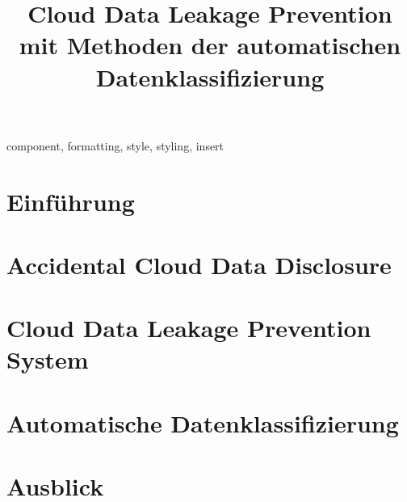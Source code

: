 \documentclass[conference]{IEEEtran}
\begin{document}
\title{Cloud Data Leakage Prevention mit Methoden der automatischen Datenklassifizierung}

\author{
}

\maketitle

\begin{abstract}
    
\end{abstract}

\begin{IEEEkeywords}
    component, formatting, style, styling, insert
\end{IEEEkeywords}

\section{Einführung}


\section{Accidental Cloud Data Disclosure} \label{threat-kapitel}


\section{Cloud Data Leakage Prevention System}


\section{Automatische Datenklassifizierung}


\section{Ausblick}


\balance


\end{document}

